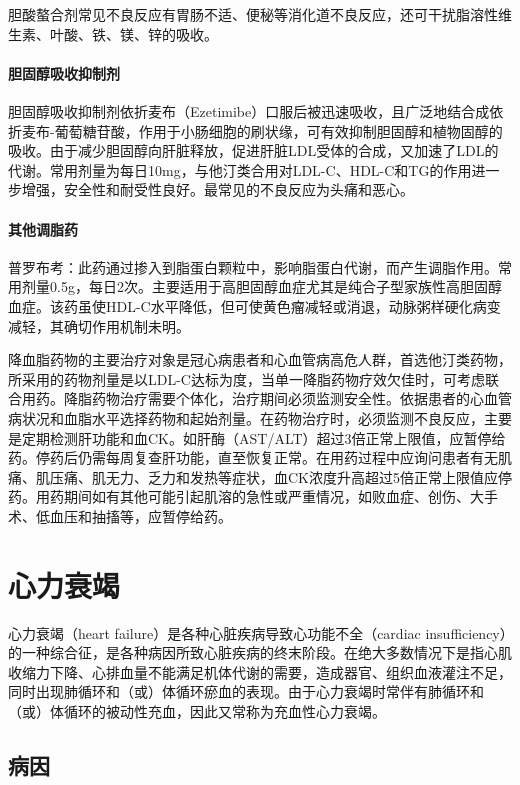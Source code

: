 胆酸螯合剂常见不良反应有胃肠不适、便秘等消化道不良反应，还可干扰脂溶性维生素、叶酸、铁、镁、锌的吸收。
\paragraph{胆固醇吸收抑制剂}

胆固醇吸收抑制剂依折麦布（Ezetimibe）口服后被迅速吸收，且广泛地结合成依折麦布-葡萄糖苷酸，作用于小肠细胞的刷状缘，可有效抑制胆固醇和植物固醇的吸收。由于减少胆固醇向肝脏释放，促进肝脏LDL受体的合成，又加速了LDL的代谢。常用剂量为每日10mg，与他汀类合用对LDL-C、HDL-C和TG的作用进一步增强，安全性和耐受性良好。最常见的不良反应为头痛和恶心。
\paragraph{其他调脂药}

普罗布考：此药通过掺入到脂蛋白颗粒中，影响脂蛋白代谢，而产生调脂作用。常用剂量0.5g，每日2次。主要适用于高胆固醇血症尤其是纯合子型家族性高胆固醇血症。该药虽使HDL-C水平降低，但可使黄色瘤减轻或消退，动脉粥样硬化病变减轻，其确切作用机制未明。

降血脂药物的主要治疗对象是冠心病患者和心血管病高危人群，首选他汀类药物，所采用的药物剂量是以LDL-C达标为度，当单一降脂药物疗效欠佳时，可考虑联合用药。降脂药物治疗需要个体化，治疗期间必须监测安全性。依据患者的心血管病状况和血脂水平选择药物和起始剂量。在药物治疗时，必须监测不良反应，主要是定期检测肝功能和血CK。如肝酶（AST/ALT）超过3倍正常上限值，应暂停给药。停药后仍需每周复查肝功能，直至恢复正常。在用药过程中应询问患者有无肌痛、肌压痛、肌无力、乏力和发热等症状，血CK浓度升高超过5倍正常上限值应停药。用药期间如有其他可能引起肌溶的急性或严重情况，如败血症、创伤、大手术、低血压和抽搐等，应暂停给药。

\section{心力衰竭}

心力衰竭（heart failure）是各种心脏疾病导致心功能不全（cardiac
insufficiency）的一种综合征，是各种病因所致心脏疾病的终末阶段。在绝大多数情况下是指心肌收缩力下降、心排血量不能满足机体代谢的需要，造成器官、组织血液灌注不足，同时出现肺循环和（或）体循环瘀血的表现。由于心力衰竭时常伴有肺循环和（或）体循环的被动性充血，因此又常称为充血性心力衰竭。

\subsection{病因}

